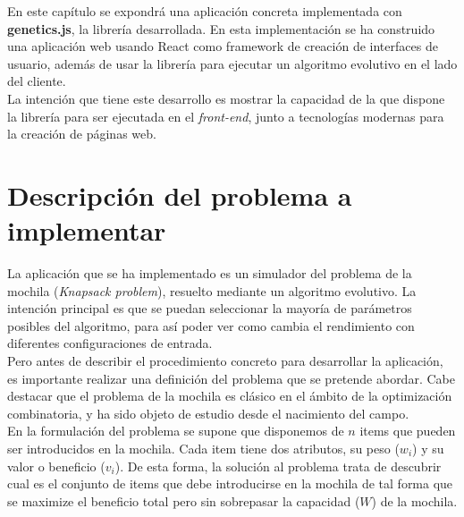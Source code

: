 

En este capítulo se expondrá una aplicación concreta implementada con \textbf{genetics.js}, la librería desarrollada. En esta implementación se ha construido una aplicación web usando React como framework de creación de interfaces de usuario, además de usar la librería para ejecutar un algoritmo evolutivo en el lado del cliente. \\

La intención que tiene este desarrollo es mostrar la capacidad de la que dispone la librería para ser ejecutada en el \textit{front-end}, junto a tecnologías modernas para la creación de páginas web. \\

\section{Descripción del problema a implementar}

La aplicación que se ha implementado es un simulador del problema de la mochila (\textit{Knapsack problem}), resuelto mediante un algoritmo evolutivo. La intención principal es que se puedan seleccionar la mayoría de parámetros posibles del algoritmo, para así poder ver como cambia el rendimiento con diferentes configuraciones de entrada. \\

Pero antes de describir el procedimiento concreto para desarrollar la aplicación, es importante realizar una definición del problema que se pretende abordar. Cabe destacar que el problema de la mochila es clásico en el ámbito de la optimización combinatoria, y ha sido objeto de estudio desde el nacimiento del campo. \\

En la formulación del problema se supone que disponemos de $n$ items que pueden ser introducidos en la mochila. Cada item tiene dos atributos, su peso ($w_i$) y su valor o beneficio ($v_i$). De esta forma, la solución al problema trata de descubrir cual es el conjunto de items que debe introducirse en la mochila de tal forma que se maximize el beneficio total pero sin sobrepasar la capacidad ($W$) de la mochila. \\


